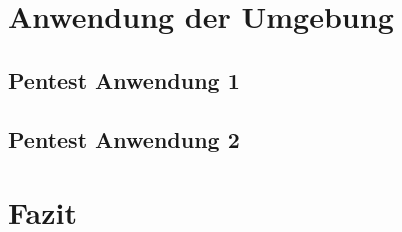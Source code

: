 \documentclass[11pt,DIV=11,twoside, openright, BCOR=3mm]{scrreprt} %
\begin{document}
			
						
				\cleardoublepage

			
				\cleardoublepage	
					
			\setcounter{tocdepth}{4}
			\tableofcontents
				\cleardoublepage	
		
			
			\setcounter{page}{1}            
            \cleardoublepage
            
            
            
            
            
			
	     	\chapter{Anwendung der Umgebung}
	     		\section{Pentest Anwendung 1}
	     		\section{Pentest Anwendung 2}
	     	\chapter{Fazit}
                \cleardoublepage	
	
			
			
			
			\newpage
			\printbibliography %
		
	
\end{document}
